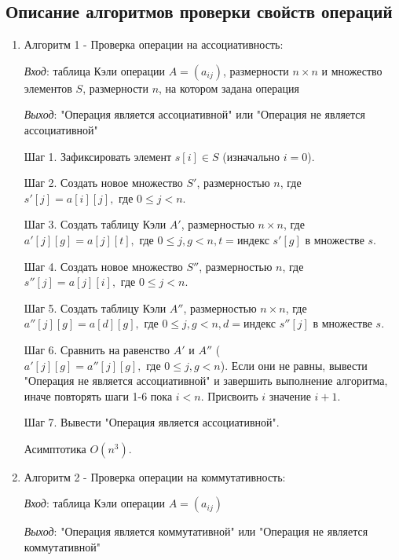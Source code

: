 \documentclass[spec, och, labwork]{shiza}
\begin{document}
\subsection{Описание алгоритмов проверки свойств операций}
            \begin{enumerate}
                \item Алгоритм 1 - Проверка операции на ассоциативность:
                
                \textit{Вход}: таблица Кэли операции $A = (a_{ij})$, размерности $n \times n$ и множество элементов $S$, размерности $n$, на котором задана операция

                \textit{Выход}: "Операция является ассоциативной" или "Операция не является ассоциативной"

                Шаг 1. Зафиксировать элемент $s[i] \in S$ (изначально $i = 0$).

                Шаг 2. Создать новое множество $S'$, размерностью $n$, где $s'[j] = a[i][j], \text{ где } 0 \leq j < n$.

                Шаг 3. Создать таблицу Кэли $A'$, размерностью $n \times n$, где $a'[j][g] = a[j][t], \text{ где } 0 \leq j, g < n, t = \text{индекс }s'[g] \text{ в множестве } s$.

                Шаг 4. Создать новое множество $S''$, размерностью $n$, где $s''[j] = a[j][i], \text{ где } 0 \leq j < n$.

                Шаг 5. Создать таблицу Кэли $A''$, размерностью $n \times n$, где $a''[j][g] = a[d][g], \text{ где } 0 \leq j, g < n, d = \text{индекс }s''[j] \text{ в множестве } s$.

                Шаг 6. Сравнить на равенство $A'$ и $A''$ ($a'[j][g] = a''[j][g], \text{ где } 0 \leq j, g < n$). Если они не равны, вывести "Операция не является ассоциативной" и завершить выполнение алгоритма,
                иначе повторять шаги 1-6 пока $i < n$. Присвоить $i$ значение $i + 1$.

                Шаг 7. Вывести "Операция является ассоциативной".

                Асимптотика $O(n^3)$.

                \item Алгоритм 2 - Проверка операции на коммутативность:
                
                \textit{Вход}: таблица Кэли операции $A = (a_{ij})$

                \textit{Выход}: "Операция является коммутативной" или "Операция не является коммутативной"


\end{enumerate}
\end{document}
